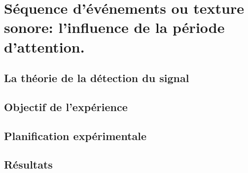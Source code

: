 \chapter[Expérience annexe: période d'attention]{Séquence d'événements ou texture sonore: l'influence de la période d'attention.}
\label{app:xp_texture}

\section{La théorie de la détection du signal}
\label{app:sdt}

\section{Objectif de l'expérience}


\section{Planification expérimentale}


\section{Résultats}
